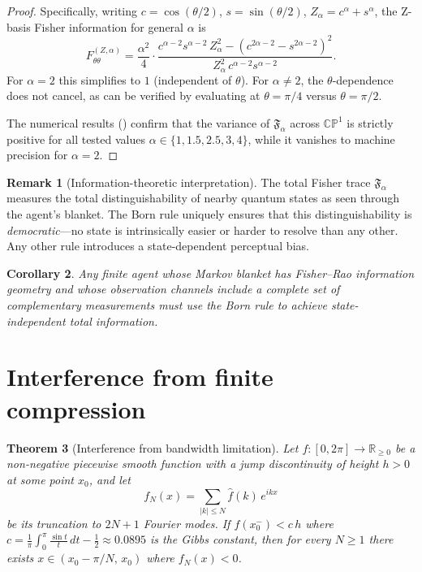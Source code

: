 \documentclass[12pt,a4paper]{article}
\newtheorem{theorem}{Theorem}[section]
\newtheorem{corollary}[theorem]{Corollary}
\theoremstyle{definition}
\newtheorem{remark}[theorem]{Remark}
\newcommand{\R}{\mathbb{R}}
\newcommand{\CP}{\mathbb{CP}}
\begin{document}
\begin{proof}
Specifically, writing $c = \cos(\theta/2)$, $s = \sin(\theta/2)$,
$Z_\alpha = c^\alpha + s^\alpha$, the Z-basis Fisher information for
general $\alpha$ is
\begin{equation}
  F^{(Z,\alpha)}_{\theta\theta}
  = \frac{\alpha^2}{4}
    \cdot \frac{c^{\alpha-2} s^{\alpha-2}\, Z_\alpha^2
                - (c^{2\alpha-2} - s^{2\alpha-2})^2}
               {Z_\alpha^2\, c^{\alpha-2} s^{\alpha-2}}.
\end{equation}
For $\alpha = 2$ this simplifies to $1$ (independent of $\theta$). For
$\alpha \neq 2$, the $\theta$-dependence does not cancel, as can be
verified by evaluating at $\theta = \pi/4$ versus $\theta = \pi/2$.

The numerical results () confirm that the variance
of $\mathfrak{F}_\alpha$ across $\CP^1$ is strictly positive for all
tested values $\alpha \in \{1, 1.5, 2.5, 3, 4\}$, while it vanishes
to machine precision for $\alpha = 2$.
\end{proof}

\begin{remark}[Information-theoretic interpretation]
The total Fisher trace $\mathfrak{F}_\alpha$ measures the total
distinguishability of nearby quantum states as seen through the agent's
blanket. The Born rule uniquely ensures that this
distinguishability is \emph{democratic}---no state is intrinsically
easier or harder to resolve than any other. Any other rule introduces a
state-dependent perceptual bias.
\end{remark}

\begin{corollary}
  \label{cor:born-forced}
  Any finite agent whose Markov blanket has Fisher--Rao information
  geometry and whose observation channels include a complete set of
  complementary measurements must use the Born rule to achieve
  state-independent total information.
\end{corollary}

\section{Interference from finite compression}
\label{sec:interference}

\begin{theorem}[Interference from bandwidth limitation]
  \label{thm:interference}
  Let $f : [0, 2\pi] \to \R_{\geq 0}$ be a non-negative piecewise
  smooth function with a jump discontinuity of height $h > 0$ at some
  point $x_0$, and let
  \begin{equation}
    f_N(x) = \sum_{|k| \leq N} \hat{f}(k)\, e^{ikx}
  \end{equation}
  be its truncation to $2N+1$ Fourier modes. If
  $f(x_0^-) < c\, h$ where $c = \tfrac{1}{\pi}\int_0^\pi
  \tfrac{\sin t}{t}\, dt - \tfrac{1}{2} \approx 0.0895$ is the Gibbs
  constant, then for every $N \geq 1$ there exists
  $x \in (x_0 - \pi/N,\, x_0)$ where $f_N(x) < 0$.
\end{theorem}
\end{document}
